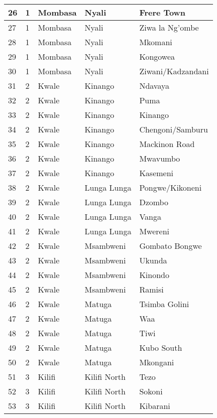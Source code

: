 \begin{table}[!ht]
\begin{tabular}{|l|l|l|l|l|}
        26 & 1 & Mombasa & Nyali & Frere Town \\ \hline
        27 & 1 & Mombasa & Nyali & Ziwa la Ng’ombe \\ \hline
        28 & 1 & Mombasa & Nyali & Mkomani \\ \hline
        29 & 1 & Mombasa & Nyali & Kongowea \\ \hline
        30 & 1 & Mombasa & Nyali & Ziwani/Kadzandani \\ \hline
        31 & 2 & Kwale & Kinango & Ndavaya \\ \hline
        32 & 2 & Kwale & Kinango & Puma \\ \hline
        33 & 2 & Kwale & Kinango & Kinango \\ \hline
        34 & 2 & Kwale & Kinango & Chengoni/Samburu \\ \hline
        35 & 2 & Kwale & Kinango & Mackinon Road \\ \hline
        36 & 2 & Kwale & Kinango & Mwavumbo \\ \hline
        37 & 2 & Kwale & Kinango & Kasemeni \\ \hline
        38 & 2 & Kwale & Lunga Lunga & Pongwe/Kikoneni \\ \hline
        39 & 2 & Kwale & Lunga Lunga & Dzombo \\ \hline
        40 & 2 & Kwale & Lunga Lunga & Vanga \\ \hline
        41 & 2 & Kwale & Lunga Lunga & Mwereni \\ \hline
        42 & 2 & Kwale & Msambweni & Gombato Bongwe \\ \hline
        43 & 2 & Kwale & Msambweni & Ukunda \\ \hline
        44 & 2 & Kwale & Msambweni & Kinondo \\ \hline
        45 & 2 & Kwale & Msambweni & Ramisi \\ \hline
        46 & 2 & Kwale & Matuga & Tsimba Golini \\ \hline
        47 & 2 & Kwale & Matuga & Waa \\ \hline
        48 & 2 & Kwale & Matuga & Tiwi \\ \hline
        49 & 2 & Kwale & Matuga & Kubo South \\ \hline
        50 & 2 & Kwale & Matuga & Mkongani \\ \hline
        51 & 3 & Kilifi & Kilifi North & Tezo \\ \hline
        52 & 3 & Kilifi & Kilifi North & Sokoni \\ \hline
        53 & 3 & Kilifi & Kilifi North & Kibarani \\ \hline

\end{tabular}
\end{table}

